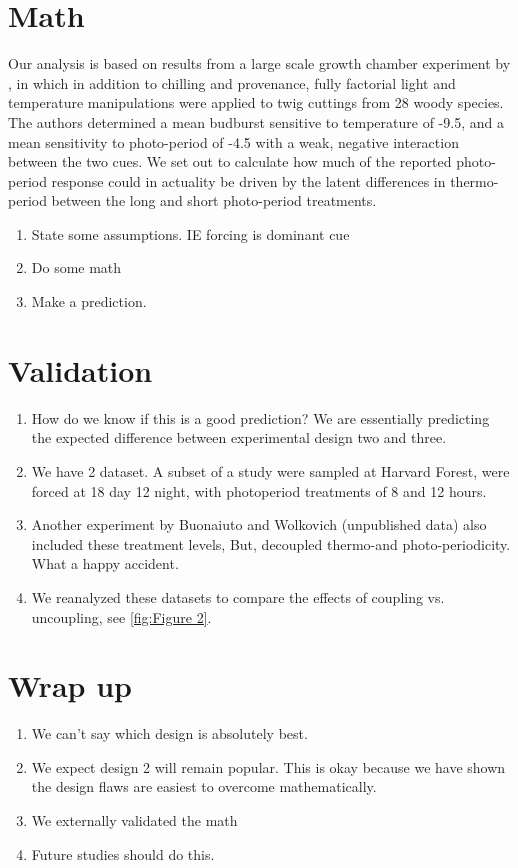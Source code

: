 \documentclass[12pt]{article}\usepackage[]{graphicx}\usepackage[]{color}
\begin{document}
\section*{Math}   
\indent\indent  Our analysis is based on results from a large scale growth chamber experiment by \citet{Flynn2018}, in which in addition to chilling and provenance, fully factorial light and temperature manipulations were applied to twig cuttings from 28 woody species. The authors determined a mean budburst  sensitive to temperature of -9.5, and  a mean sensitivity to photo-period of -4.5 with a weak, negative interaction between the two cues. We set out to calculate how much of the reported photo-period response could in actuality be driven by the latent differences in thermo-period between the long and short photo-period treatments. 
    \begin{enumerate}

    \item  State some assumptions. IE forcing is dominant cue
        \item Do some math
        \item  Make a prediction.
    \end{enumerate}



\section{Validation}
\begin{enumerate}
  \item How do we know if this is a good prediction? We are essentially predicting the expected difference between experimental design two and three.
\item We have 2 dataset. A subset of a \citet{Flynn2018} study were sampled  at Harvard Forest,  were forced at 18 day 12 night, with photoperiod treatments of 8 and 12 hours. 
\item Another experiment by Buonaiuto and Wolkovich (unpublished data) also included these treatment levels, But, decoupled thermo-and photo-periodicity. What a happy accident.
\item We reanalyzed these datasets to compare the effects of coupling vs. uncoupling, see \ref{fig:Figure 2}.

\end{enumerate}
 
 \section{Wrap up}
 \begin{enumerate}
\item We can't say which design is absolutely best.
\item We expect design 2 will remain popular. This is okay because we have shown the design flaws are easiest to overcome mathematically.  
\item We externally validated the math
\item Future studies should do this.
 \end{enumerate}
\end{document}
